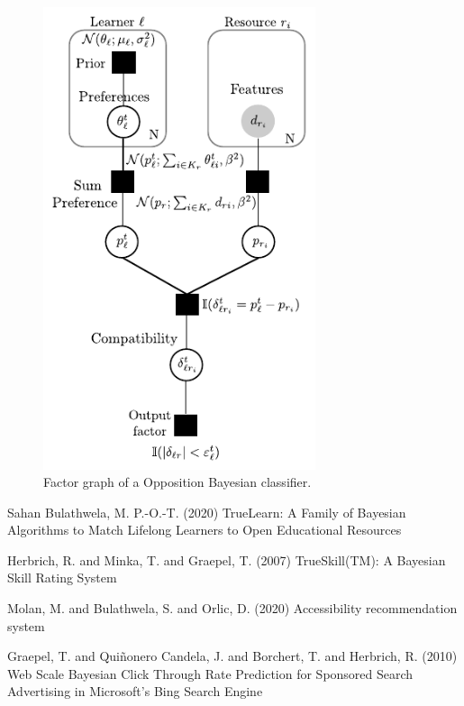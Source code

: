 \documentclass{article}
\begin{document}
\begin{figure}[h!]
\centering
\caption{Factor graph of a Opposition Bayesian classifier.}
\label{f:g}
\includegraphics[width=8cm]{fg_true}
\end{figure}





\begin{thebibliography}{99} %
Sahan Bulathwela, M. P.-O.-T. (2020)
\newblock TrueLearn: A Family of Bayesian Algorithms to Match Lifelong Learners to Open Educational Resources

Herbrich, R. and Minka, T. and Graepel, T. (2007)
\newblock TrueSkill(TM): A Bayesian Skill Rating System

Molan, M. and Bulathwela, S. and Orlic, D. (2020)
\newblock Accessibility recommendation system

Graepel, T. and Quiñonero Candela, J. and Borchert, T. and Herbrich, R. (2010)
\newblock Web Scale Bayesian Click Through Rate Prediction for Sponsored Search Advertising in Microsoft’s Bing Search Engine 

\end{thebibliography}

\end{document}
